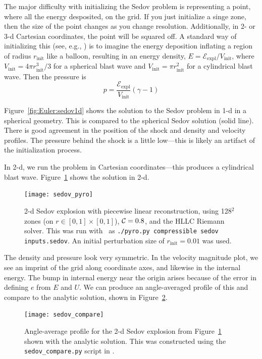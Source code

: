 The major difficulty with initializing the Sedov problem is
representing a point, where all the energy desposited, on the grid.
If you just initialize a singe zone, then the size of the point
changes as you change resolution.  Additionally, in 2- or 3-d
Cartesian coordinates, the point will be squared off.  A standard way
of initializing this (see, e.g., \cite{omang:2006}) is to imagine the
energy deposition inflating a region of radius $r_\mathrm{init}$ like
a balloon, resulting in an energy density, $E =
\mathcal{E}_\mathrm{expl}/V_\mathrm{init}$, where $V_\mathrm{init} =
4\pi r_\mathrm{init}^3/3$ for a spherical blast wave and
$V_\mathrm{init} = \pi r_\mathrm{init}^2$ for a cylindrical blast
wave. Then the pressure is
\begin{equation}
p = \frac{\mathcal{E}_\mathrm{expl}}{V_\mathrm{init}} (\gamma - 1)
\end{equation}


Figure~\ref{fig:Euler:sedov1d} shows the solution to the Sedov problem
in 1-d in a spherical geometry.  This is compared to the spherical
Sedov solution (solid line). There is good agreement in the position of the
shock and density and velocity profiles.  The pressure behind the shock
is a little low---this is likely an artifact of the initialization process.

In 2-d, we run the problem in Cartesian coordinates---this produces a cylindrical
blast wave.  Figure~\ref{fig:Euler:sedov2d} shows the solution in 2-d.
\begin{figure}[t]
\centering
\texttt{[image: sedov\_pyro]}
\caption[2-d cylindrical Sedov problem]{\label{fig:Euler:sedov2d} 2-d Sedov explosion with
  piecewise linear reconstruction, using 128$^2$ zones (on $r \in
  [0,1]\times[0,1]$), ${\mathcal{C}} = 0.8$, and the HLLC Riemann solver.  This was run
  with \pyro\ as {\tt ./pyro.py compressible sedov inputs.sedov}.  An initial
  perturbation size of $r_\mathrm{init} = 0.01$ was used.}
\end{figure}
The density and pressure look very symmetric.  In the velocity magnitude
plot, we see an imprint of the grid along coordinate axes, and likewise
in the internal energy.  The bump in internal energy near the origin arises
because of the error in defining $e$ from $E$ and $U$.  We can produce an angle-averaged
profile of this and compare to the analytic solution, shown in Figure~\ref{fig:Euler:sedov2d_compare}.

\begin{figure}[t]
\centering
\texttt{[image: sedov\_compare]}
\caption[2-d cylindrical Sedov problem]{\label{fig:Euler:sedov2d_compare} Angle-average 
  profile for the 2-d Sedov explosion from Figure~\ref{fig:Euler:sedov2d} shown
  with the analytic solution.  This was constructed using the {\tt sedov\_compare.py}
  script in \pyro.}
\end{figure}


